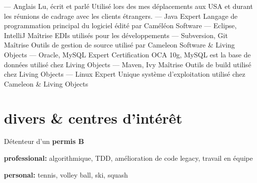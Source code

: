 \documentclass{friggeri-cv} 	%
\begin{document}
\begin{entrylist}
\entry
{---}
{Anglais}
{Lu, écrit et parlé}
{Utilisé lors des mes déplacements aux USA et durant les réunions de cadrage avec les clients
étrangers.}
\entry
{---}
{Java}
{Expert}
{Langage de programmation principal du logiciel édité par Caméléon Software}
\entry
{---}
{Eclipse, IntelliJ}
{Maîtrise}
{EDIs utilisés pour les développements}
\entry
{---}
{Subversion, Git}
{Maîtrise}
{Outils de gestion de source utilisé par Cameleon Software \& Living Objects}
\entry
{---}
{Oracle, MySQL}
{Expert}
{Certification OCA 10g, MySQL est la base de données utilisé chez Living Objects}
\entry
{---}
{Maven, Ivy}
{Maîtrise}
{Outils de build utilisé chez Living Objects}
\entry
{---}
{Linux}
{Expert}
{Unique système d'exploitation utilisé chez Cameleon \& Living Objects}
\end{entrylist}


\section{divers \& centres d'intérêt}

Détenteur d'un \textbf{permis B}

\textbf{professional:} algorithmique, TDD, amélioration de code legacy, travail en équipe

\textbf{personal:} tennis, volley ball, ski, squash
\end{document}
